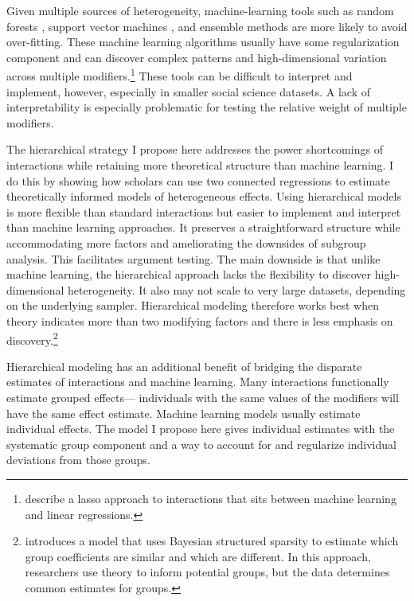 \documentclass[12pt]{article}
\begin{document}
Given multiple sources of heterogeneity, machine-learning tools such as random forests \citep{GreenKern2012, WagerAthey2018}, support vector machines \citep{ImaiRatkovic2013}, and ensemble methods \citep{Grimmeretal2017, Kuenzeletal2019, Dorieetal2022} are more likely to avoid over-fitting.
These machine learning algorithms usually have some regularization component and can discover complex patterns and high-dimensional variation across multiple modifiers.\footnote{\citet{BlackwellOlson2022} describe a lasso approach to interactions that sits between machine learning and linear regressions.}
These tools can be difficult to interpret and implement, however, especially in smaller social science datasets. 
A lack of interpretability is especially problematic for testing the relative weight of multiple modifiers. 


The hierarchical strategy I propose here addresses the power shortcomings of interactions while retaining more theoretical structure than machine learning.
I do this by showing how scholars can use two connected regressions to estimate theoretically informed models of heterogeneous effects.
Using hierarchical models is more flexible than standard interactions but easier to implement and interpret than machine learning approaches.  
It preserves a straightforward structure while accommodating more factors and ameliorating the downsides of subgroup analysis. 
This facilitates argument testing.
The main downside is that unlike machine learning, the hierarchical approach lacks the flexibility to discover high-dimensional heterogeneity. 
It also may not scale to very large datasets, depending on the underlying sampler.
Hierarchical modeling therefore works best when theory indicates more than two modifying factors and there is less emphasis on discovery.\footnote{\citet{Goplerud2021} introduces a model that uses Bayesian structured sparsity to estimate which group coefficients are similar and which are different. In this approach, researchers use theory to inform potential groups, but the data determines common estimates for groups.} 


Hierarchical modeling has an additional benefit of bridging the disparate estimates of interactions and machine learning. 
Many interactions functionally estimate grouped effects--- individuals with the same values of the modifiers will have the same effect estimate. 
Machine learning models usually estimate individual effects. 
The model I propose here gives individual estimates with the systematic group component and a way to account for and regularize individual deviations from those groups.
\end{document}
